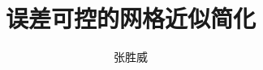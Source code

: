 \documentclass[master,oneside]{zjuthesis} %
\title{误差可控的网格近似简化} %
\author{张胜威}
\institute{计算机科学与技术学院}         %
\begin{document}
\maketitle

\abstractmatter



\frontmatter
\tableofcontents %
\listoffigures   %
\listoftables    %
%

\mainmatter
%
%


%


\backmatter



%

%


\end{document}
